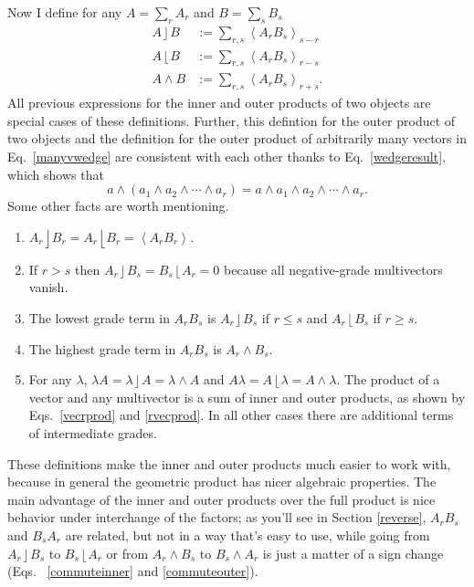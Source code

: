 \documentclass{utarticle}
\DeclareMathOperator{\lin}{\rfloor}
\DeclareMathOperator{\rin}{\lfloor}
\DeclareMathOperator{\out}{\wedge}
\newcommand{\grade}[2][]{\ensuremath{\left\langle #2 \right\rangle_{#1}}}
\begin{document}
Now I define for any $A=\sum_r A_r$ and 
$B=\sum_s B_s$
\begin{align}
A \lin B & := \sum_{r,s} \grade[s-r]{A_r B_s} \nonumber \\
A \rin B & := \sum_{r,s} \grade[r-s]{A_r B_s} \nonumber \\
A \out B & := \sum_{r,s} \grade[r+s]{A_r B_s}.
\label{geninoutdefs}
\end{align}
All previous expressions for the inner and outer products of two 
objects are special cases of these definitions.  Further, this defintion for
the outer product of two objects and the definition for the outer product of 
arbitrarily many vectors in Eq.~\eqref{manyvwedge} are consistent with each
other thanks to Eq.~\eqref{wedgeresult}, which shows that
\begin{equation}
a \out (a_1 \out a_2 \out \dotsb \out a_r) = 
a \out a_1 \out a_2 \out \dotsb \out a_r. 
\end{equation}
Some other facts are worth mentioning.
\begin{enumerate}
\item $A_r \lin B_r = A_r \rin B_r = \grade{A_r B_r}$.
\item If $r > s$ then $A_r 
      \lin B_s = B_s \rin A_r = 0$ because all negative-grade multivectors vanish.
\item The lowest grade term in $A_r B_s$ is $A_r \lin B_s$ if $ r \leq s$ and 
      $A_r \rin B_s$ if $r \geq s$.
\item The highest grade term in $A_r B_s$ is $A_r \out B_s$.  
\item For any $\lambda$, $\lambda A = \lambda \lin A = \lambda \out A$ and 
      $A \lambda = A \rin \lambda = A \out \lambda$.  The 
      product of a vector and any multivector is a sum of inner and outer products, as
      shown by Eqs.~\eqref{vecrprod} and \eqref{rvecprod}.  In all other cases there are 
      additional terms of intermediate grades.
\end{enumerate}

These definitions make the inner and outer products much easier to work 
with, because in general the geometric product has nicer algebraic properties.
The main advantage of the inner and outer products over the full product 
is nice behavior under interchange of the factors; as you'll see in Section \ref{reverse},
$A_r B_s$ and $B_s A_r$ are related, but not in a way that's easy to use, while going
from $A_r \lin B_s$ to $B_s \rin A_r$ or from $A_r \out B_s$ to $B_s \out A_r$ is just 
a matter of a sign change (Eqs.~ \eqref{commuteinner} and \eqref{commuteouter}).
\end{document}

